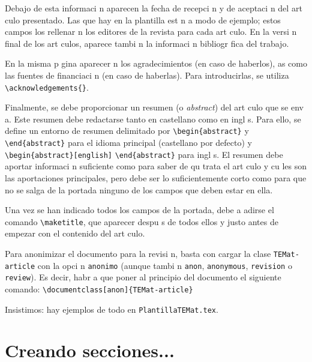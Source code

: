 \documentclass{article}
\begin{document}
Debajo de esta informaci n aparecen la fecha de recepci n y de aceptaci n del art culo presentado.
Las que hay en la plantilla est n a modo de ejemplo; estos campos los rellenar n los editores de la revista para cada art culo.
En la versi n final de los art culos, aparece tambi n la informaci n bibliogr fica del trabajo.

En la misma p gina aparecer n los agradecimientos (en caso de haberlos), as  como las fuentes de financiaci n (en caso de haberlas).
Para introducirlas, se utiliza \verb+\acknowledgements{}+.

Finalmente, se debe proporcionar un resumen (o \textit{abstract}) del art culo que se env a. Este resumen debe redactarse tanto en castellano como en ingl s.
Para ello, se define un entorno de resumen delimitado por \verb+\begin{abstract}+ y \verb+\end{abstract}+ para el idioma principal (castellano por defecto) y \verb+\begin{abstract}[english]+ \verb+\end{abstract}+ para ingl s.
El resumen debe aportar informaci n suficiente como para saber de qu  trata el art culo y cu les son las aportaciones principales, pero debe ser lo suficientemente corto como para que no se salga de la portada ninguno de los campos que deben estar en ella.

Una vez se han indicado todos los campos de la portada, debe a adirse el comando \verb+\maketitle+, que aparecer  despu s de todos ellos y justo antes de empezar con el contenido del art culo.

Para anonimizar el documento para la revisi n, basta con cargar la clase \verb+TEMat-article+ con la opci n \verb+anonimo+ (aunque tambi n \verb+anon+, \verb+anonymous+, \verb+revision+ o \verb+review+).
Es decir, habr a que poner al principio del documento el siguiente comando: \verb+\documentclass[anon]{TEMat-article}+

Insistimos: hay ejemplos de todo en \verb+PlantillaTEMat.tex+.



\section{Creando secciones...}
\end{document}
